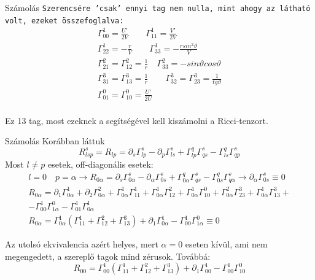 \documentclass[10pt]{beamer}
\begin{document}
\begin{frame}[t]{Számolás}
\texttt{Szerencsére 'csak' ennyi tag nem nulla, mint ahogy az látható volt, ezeket összefoglalva:}
\begin{gather*}
\Gamma_{00}^{1} = \frac{U'}{2V} \quad \quad \Gamma_{11}^{1} = \frac{V'}{2V} \\
\Gamma_{22}^{1} = -\frac{r}{V} \quad \quad \Gamma_{33}^{1}=-\frac{rsin^{2}\vartheta}{V} \\
\Gamma_{21}^{2} = \Gamma_{12}^{2} = \frac{1}{r} \quad \Gamma_{33}^{2} = -sin\vartheta cos\vartheta \\
\Gamma_{31}^{3} = \Gamma_{13}^{3} = \frac{1}{r} \quad \quad \Gamma_{32}^{3} = \Gamma_{23}^{3} = \frac{1}{tg\vartheta} \\
\Gamma_{01}^{0} = \Gamma_{10}^{0} = \frac{U'}{2U} \\
\end{gather*}
\par Ez 13 tag, most ezeknek a segítségével kell kiszámolni a Ricci-tenzort.
\end{frame}

\begin{frame}[t]{Számolás}
Korábban láttuk $$R^{s}_{lsp} = R_{lp} = \partial_{s}\Gamma_{lp}^{s} - \partial_{p}\Gamma_{ls}^{s} + \Gamma_{lp}^{q}\Gamma_{qs}^{s} - \Gamma_{ls}^{q}\Gamma_{qp}^{s}$$
Most $l \neq p$ esetek, off-diagonális esetek:
\begin{gather*}
l = 0 \quad p = \alpha \rightarrow R_{0\alpha} = \partial_{s}\Gamma_{0\alpha}^{s} - \partial_{\alpha}\Gamma_{0s}^{s} + \Gamma_{0\alpha}^{q}\Gamma_{qs}^{s} - \Gamma_{0s}^{q}\Gamma_{q\alpha}^{s}
\rightarrow \partial_{\alpha}\Gamma_{0s}^{s} \equiv 0 \\
R_{0\alpha} = \partial_{1}\Gamma_{0\alpha}^{1} + \partial_{2}\Gamma_{0\alpha}^{2} + \Gamma_{0\alpha}^{1}\Gamma_{11}^{1} + 
\Gamma_{0\alpha}^{1}\Gamma_{12}^{2} + \Gamma_{0\alpha}^{1}\Gamma_{10}^{0} + \Gamma_{0\alpha}^{2}\Gamma_{23}^{3} + 
\Gamma_{0\alpha}^{1}\Gamma_{13}^{3} + \\
 - \Gamma_{00}^{1}\Gamma_{1\alpha}^{0} - \Gamma_{01}^{1}\Gamma_{0\alpha}^{1} \\
R_{0\alpha} = \Gamma_{0\alpha}^{1}(\Gamma_{11}^{1} + \Gamma_{12}^{2} + \Gamma_{13}^{3}) + \partial_{1}\Gamma_{0\alpha}^{1}
- \Gamma_{00}^{1}\Gamma_{1\alpha}^{0} \equiv 0
\end{gather*}
\par Az utolsó ekvivalencia azért helyes, mert $\alpha = 0$ eseten kívül, ami nem megengedett, a szereplő tagok mind zérusok. Továbbá:
$$R_{00} = \Gamma_{00}^{1}(\Gamma_{11}^{1} + \Gamma_{12}^{2} + \Gamma_{13}^{3}) + \partial_{1}\Gamma_{00}^{1}
- \Gamma_{00}^{1}\Gamma_{10}^{0}$$
\end{frame}
\end{document}
